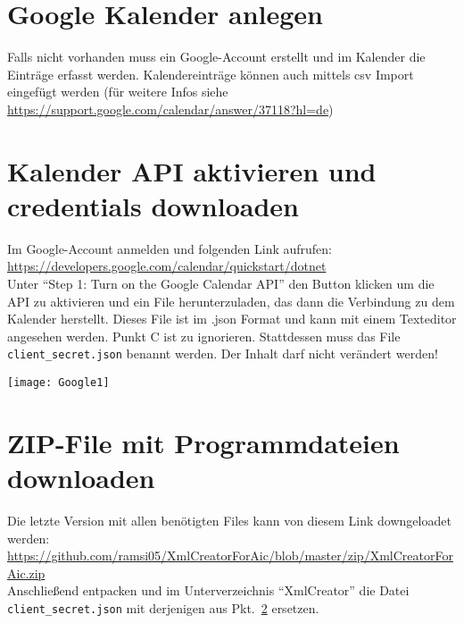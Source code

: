 \documentclass[a4paper,onecolumn,notitlepage,11pt,liststotoc,bibtotoc]{scrartcl}
\begin{document}
\section{Google Kalender anlegen}
Falls nicht vorhanden muss ein Google-Account erstellt und im Kalender die Einträge erfasst werden. Kalendereinträge können auch mittels csv Import eingefügt werden (für weitere Infos siehe \url{https://support.google.com/calendar/answer/37118?hl=de})
%
\section{Kalender API aktivieren und credentials downloaden}
\label{sec:cred}
Im Google-Account anmelden und folgenden Link aufrufen:\\
\url{https://developers.google.com/calendar/quickstart/dotnet}\\
Unter "`Step 1: Turn on the Google Calendar API"' den Button klicken um die API zu aktivieren und ein File herunterzuladen, das dann die Verbindung zu dem Kalender herstellt. Dieses File ist im .json Format und kann mit einem Texteditor angesehen werden.
Punkt C ist zu ignorieren. Stattdessen muss das File \texttt{client\_secret.json} benannt werden. Der Inhalt darf nicht verändert werden!
\begin{center}
  \texttt{[image: Google1]}
\end{center}
%
\section{ZIP-File mit Programmdateien downloaden}
Die letzte Version mit allen benötigten Files kann von diesem Link downgeloadet werden:\\
\url{https://github.com/ramsi05/XmlCreatorForAic/blob/master/zip/XmlCreatorForAic.zip}\\
Anschließend entpacken und im Unterverzeichnis "`XmlCreator"' die Datei \texttt{client\_secret.json} mit derjenigen aus Pkt.~\ref{sec:cred} ersetzen.
%
\end{document}
